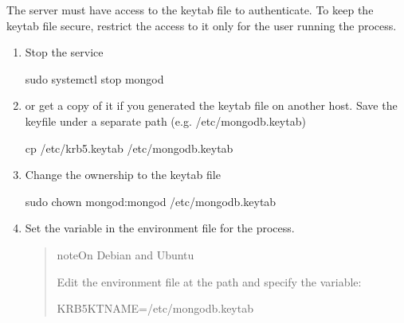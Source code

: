 \documentclass[letterpaper,10pt,english]{sphinxmanual}
\begin{document}
\sphinxAtStartPar
The  server must have access to the keytab file to authenticate. To keep the keytab file secure, restrict the access to it only for the user running the  process.
\begin{enumerate}
%
\item {} 
\sphinxAtStartPar
Stop the  service

\begin{sphinxVerbatim}[commandchars=\\\{\}]
\PYGZdl{} sudo systemctl stop mongod
\end{sphinxVerbatim}

\item {} 
\sphinxAtStartPar
{} or get a copy of it if you generated the keytab file on another host. Save the keyfile under a separate path (e.g. /etc/mongodb.keytab)

\begin{sphinxVerbatim}[commandchars=\\\{\}]
\PYGZdl{} cp /etc/krb5.keytab /etc/mongodb.keytab
\end{sphinxVerbatim}

\item {} 
\sphinxAtStartPar
Change the ownership to the keytab file

\begin{sphinxVerbatim}[commandchars=\\\{\}]
\PYGZdl{} sudo chown mongod:mongod /etc/mongodb.keytab
\end{sphinxVerbatim}

\item {} 
\sphinxAtStartPar
Set the  variable in the environment file for the  process.
\begin{quote}

\begin{sphinxadmonition}{note}{On Debian and Ubuntu}

\sphinxAtStartPar
Edit the environment file at the path  and specify the  variable:

\begin{sphinxVerbatim}[commandchars=\\\{\}]
KRB5\PYGZus{}KTNAME=/etc/mongodb.keytab
\end{sphinxVerbatim}


\end{sphinxadmonition}
\end{quote}
\end{enumerate}
\end{document}
